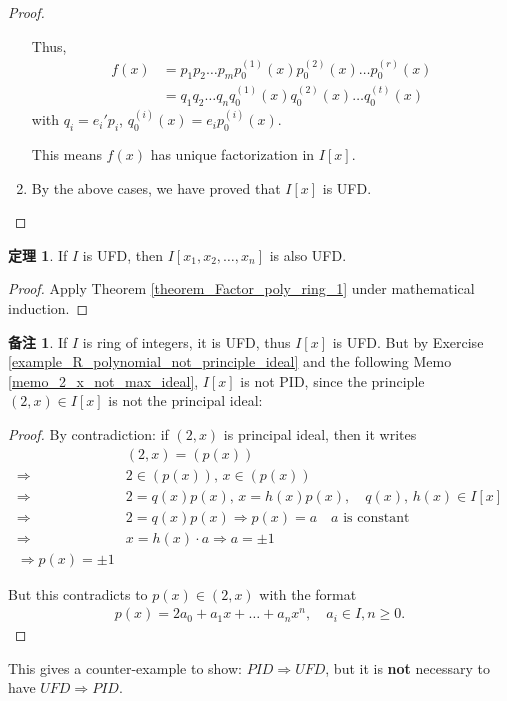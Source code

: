 \documentclass[utf8]{ctexbook}
\theoremstyle{definition}
\newtheorem{prototheorem}{定理}[section]
\newenvironment{theorem}
   {\colorlet{shadecolor}{red!30}\begin{shaded}\begin{prototheorem}}
   {\end{prototheorem}\end{shaded}}
\newtheorem{memo}{备注}[section]
\begin{document}
\begin{proof}
\begin{enumerate}
{\begin{itemize}
{Thus,
\begin{align*}
f(x) &= p_1 p_2 \ldots p_m p_0 ^{(1)} (x) p_0 ^{(2)} (x) \ldots p_0 ^{(r)} (x)  \\
&= q_1 q_2 \ldots q_n q_0 ^{(1)} (x) q_0 ^{(2)} (x) \ldots q_0 ^{(t)} (x) 
\end{align*}
with $q_i = e_i ' p_i $, $q_0 ^{(i)} (x) = e_i p_0 ^{(i)} (x)$.

This means $f(x)$ has unique factorization in $I[x]$. 
}
\end{itemize}
}
\item{By the above cases, we have proved that $I[x]$ is UFD.}
\end{enumerate}
\end{proof}


\begin{theorem}
\label{theorem_Factor_poly_ring_2}
If $I$ is UFD, then $I[x_1, x_2, \ldots, x_n]$ is also UFD.
\end{theorem}

\begin{proof}
Apply Theorem \ref{theorem_Factor_poly_ring_1} under mathematical induction.
\end{proof}


\begin{memo}
If $I$ is ring of integers, it is UFD, thus $I[x]$ is UFD. But by Exercise \ref{example_R_polynomial_not_principle_ideal} and the following Memo \ref{memo_2_x_not_max_ideal}, $I[x]$ is not PID, since the principle $(2, x) \in I[x]$ is not the principal ideal: 

\begin{proof}

By contradiction: if $(2,x)$ is principal ideal, then it writes
\begin{align*}
& (2,x) = (p(x)) \\
\Longrightarrow & 2 \in (p(x)), \, x \in (p(x)) \\
\Longrightarrow & 2 = q(x) p(x), \, x = h(x) p(x), \quad q(x), \, h(x) \in I[x] \\
\Longrightarrow & 2 = q(x) p(x) \Longrightarrow p(x) = a \quad a \mbox{ is constant} \\
\Longrightarrow & x = h(x) \cdot a \Longrightarrow a = \pm 1 \\
\Longrightarrow p(x) = \pm 1 
\end{align*}

But this contradicts to $p(x) \in (2, x)$ with the format
\begin{align*}
p(x) = 2 a_0 + a_1 x + \ldots + a_n x^n, \quad a_i \in I, n \geq 0 .
\end{align*}

\end{proof}


This gives a counter-example to show: $PID \Longrightarrow UFD$, but it is \textbf{not} necessary to have $UFD \Longrightarrow PID$.
\end{memo}
\end{document}

